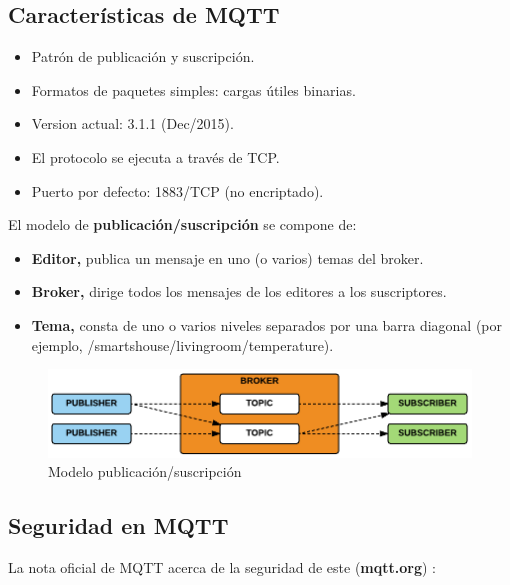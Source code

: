 \subsection{Características de MQTT}

\begin{itemize}
    \item Patrón de publicación y suscripción.
    \item Formatos de paquetes simples: cargas útiles binarias.
    \item Version actual: 3.1.1 (Dec/2015).
    \item El protocolo se ejecuta a través de TCP.
    \item Puerto por defecto: 1883/TCP (no encriptado).
\end{itemize}


El modelo de \textbf{publicación/suscripción} se compone de:

\begin{itemize}
    \item \textbf{Editor,} publica un mensaje en uno (o varios) temas del broker.
    \item \textbf{Broker,} dirige todos los mensajes de los editores a los suscriptores.
    \item \textbf{Tema,} consta de uno o varios niveles separados por una barra diagonal (por ejemplo, /smartshouse/livingroom/temperature).
\end{itemize}

\begin{figure}[hb!]
    \centering
    \includegraphics[width=\linewidth]{imagenes/sub-pattern-mqtt.png}
    \caption{Modelo publicación/suscripción \cite{disenio-mqtt}}
    \label{fig:figure13-mqtt-analysis}
\end{figure}

\subsection{Seguridad en MQTT}

La nota oficial de MQTT acerca de la seguridad de este (\textbf{mqtt.org}) \cite{mqtt}: \\

